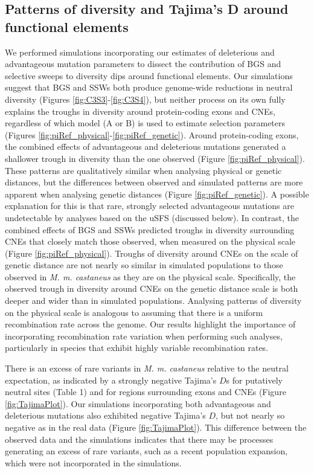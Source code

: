 \subsection{Patterns of diversity and Tajima’s D around functional elements}

	We performed simulations incorporating our estimates of deleterious and advantageous mutation parameters to dissect the contribution of BGS and selective sweeps to diversity dips around functional elements. Our simulations suggest that BGS and SSWs both produce genome-wide reductions in neutral diversity (Figures \ref{fig:C3S3}-\ref{fig:C3S4}), but neither process on its own fully explains the troughs in diversity around protein-coding exons and CNEs, regardless of which model (A or B) is used to estimate selection parameters (Figures \ref{fig:piRef_physical}-\ref{fig:piRef_genetic}). Around protein-coding exons, the combined effects of advantageous and deleterious mutations generated a shallower trough in diversity than the one observed (Figure \ref{fig:piRef_physical}). These patterns are qualitatively similar when analysing physical or genetic distances, but the differences between observed and simulated patterns are more apparent when analysing genetic distances (Figure \ref{fig:piRef_genetic}). A possible explanation for this is that rare, strongly selected advantageous mutations are undetectable by analyses based on the uSFS (discussed below). In contrast, the combined effects of BGS and SSWs predicted troughs in diversity surrounding CNEs that closely match those observed, when measured on the physical scale (Figure \ref{fig:piRef_physical}). Troughs of diversity around CNEs on the scale of genetic distance are not nearly so similar in simulated populations to those observed in \textit{M. m. castaneus} as they are on the physical scale. Specifically, the observed trough in diversity around CNEs on the genetic distance scale is both deeper and wider than in simulated populations. Analysing patterns of diversity on the physical scale is analogous to assuming that there is a uniform recombination rate across the genome. Our results highlight the importance of incorporating recombination rate variation when performing such analyses, particularly in species that exhibit highly variable recombination rates.

	There is an excess of rare variants in \textit{M. m. castaneus} relative to the neutral expectation, as indicated by a strongly negative Tajima’s $D$s for putatively neutral sites (Table 1) and for regions surrounding exons and CNEs (Figure \ref{fig:TajimaPlot}). Our simulations incorporating both advantageous and deleterious mutations also exhibited negative Tajima’s $D$, but not nearly so negative as in the real data (Figure \ref{fig:TajimaPlot}). This difference between the observed data and the simulations indicates that there may be processes generating an excess of rare variants, such as a recent population expansion, which were not incorporated in the simulations.

